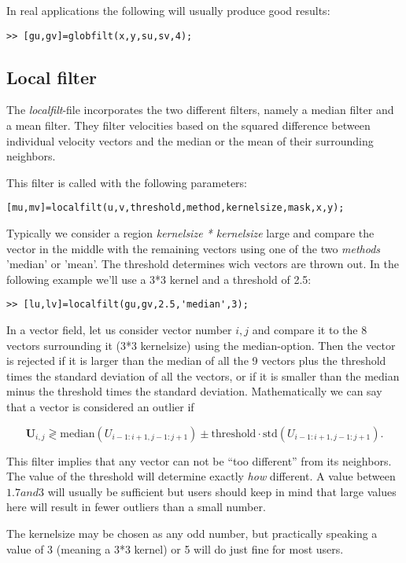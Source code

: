 \documentclass{book}
\begin{document}
In real applications the following will usually produce good results:
\begin{verbatim}
>> [gu,gv]=globfilt(x,y,su,sv,4);
\end{verbatim}

\subsection{Local filter}

The {\em localfilt}-file incorporates the two different filters,
namely a median filter and a mean filter. They filter velocities based
on the squared difference between individual velocity vectors
and the median or the mean of their surrounding neighbors.

This filter is called with the following parameters:
\begin{verbatim}
[mu,mv]=localfilt(u,v,threshold,method,kernelsize,mask,x,y);
\end{verbatim}

Typically we consider a region {\em kernelsize * kernelsize} large and
compare the vector in the middle with the remaining vectors using one of
the two {\em methods} 'median' or 'mean'. The threshold determines wich
vectors are thrown out. In the following example we'll use a 3*3 kernel
and a threshold of 2.5:
\begin{verbatim}
>> [lu,lv]=localfilt(gu,gv,2.5,'median',3);
\end{verbatim}

In a vector field, let us consider vector number $i,j$ and compare it to
the 8 vectors surrounding it (3*3 kernelsize) using the median-option.
Then the vector is rejected if it is larger than the median of all the 9
vectors plus the threshold times the standard deviation of all the
vectors, or if it is smaller than the median minus the threshold times
the standard deviation. Mathematically we can say that a vector is
considered an outlier if

\[ \mathbf{U}_{i,j} \gtrless \mbox{median}(U_{i-1:i+1,j-1:j+1}) \pm \mbox{threshold} \cdot \mbox{std}(U_{i-1:i+1,j-1:j+1}).
\] 

This filter implies that any vector can not be ``too different'' from
its neighbors. The value of the threshold will determine exactly {\em
how} different. A value between $1.7 and 3$ will usually be sufficient
but users should keep in mind that large values here will result in
fewer outliers than a small number.

The kernelsize may be chosen as any odd number, but practically speaking
a value of 3 (meaning a 3*3 kernel) or 5 will do just fine for most users.
\end{document}
